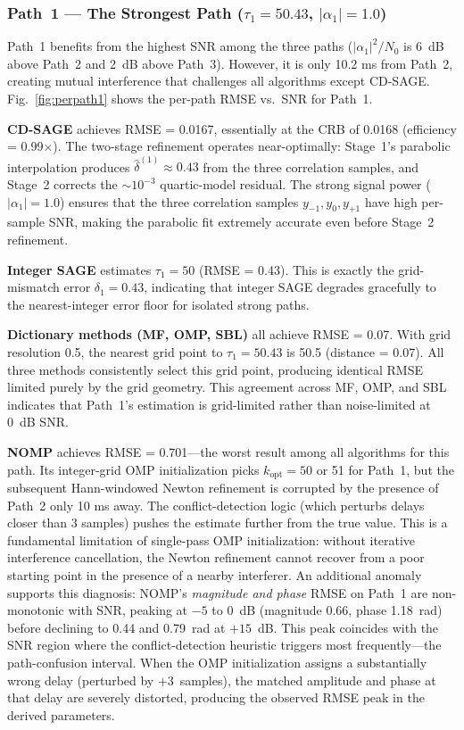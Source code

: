 \documentclass[a4paper,fleqn]{cas-dc}
\begin{document}
\subsubsection{Path~1 --- The Strongest Path ($\tau_1 = 50.43$, $|\alpha_1| = 1.0$)}

Path~1 benefits from the highest SNR among the three paths ($|\alpha_1|^2 / N_0$ is 6~dB above Path~2 and 2~dB above Path~3). However, it is only 10.2 ms from Path~2, creating mutual interference that challenges all algorithms except CD-SAGE. Fig.~\ref{fig:perpath1} shows the per-path RMSE vs.\ SNR for Path~1.

\textbf{CD-SAGE} achieves RMSE = 0.0167, essentially at the CRB of 0.0168 (efficiency = 0.99$\times$). The two-stage refinement operates near-optimally: Stage~1's parabolic interpolation produces $\hat{\delta}^{(1)} \approx 0.43$ from the three correlation samples, and Stage~2 corrects the $\sim 10^{-3}$ quartic-model residual. The strong signal power ($|\alpha_1|=1.0$) ensures that the three correlation samples $y_{-1}, y_0, y_{+1}$ have high per-sample SNR, making the parabolic fit extremely accurate even before Stage~2 refinement.

\textbf{Integer SAGE} estimates $\tau_1 = 50$ (RMSE = 0.43). This is exactly the grid-mismatch error $\delta_1 = 0.43$, indicating that integer SAGE degrades gracefully to the nearest-integer error floor for isolated strong paths.

\textbf{Dictionary methods (MF, OMP, SBL)} all achieve RMSE = 0.07. With grid resolution 0.5, the nearest grid point to $\tau_1 = 50.43$ is 50.5 (distance = 0.07). All three methods consistently select this grid point, producing identical RMSE limited purely by the grid geometry. This agreement across MF, OMP, and SBL indicates that Path~1's estimation is grid-limited rather than noise-limited at 0~dB SNR.

\textbf{NOMP} achieves RMSE = 0.701---the worst result among all algorithms for this path. Its integer-grid OMP initialization picks $k_{\text{opt}} = 50$ or 51 for Path~1, but the subsequent Hann-windowed Newton refinement is corrupted by the presence of Path~2 only 10 ms away. The conflict-detection logic (which perturbs delays closer than 3 samples) pushes the estimate further from the true value. This is a fundamental limitation of single-pass OMP initialization: without iterative interference cancellation, the Newton refinement cannot recover from a poor starting point in the presence of a nearby interferer. An additional anomaly supports this diagnosis: NOMP's \textit{magnitude and phase} RMSE on Path~1 are non-monotonic with SNR, peaking at $-5$ to $0$~dB (magnitude 0.66, phase 1.18~rad) before declining to 0.44 and 0.79~rad at $+15$~dB. This peak coincides with the SNR region where the conflict-detection heuristic triggers most frequently---the path-confusion interval. When the OMP initialization assigns a substantially wrong delay (perturbed by $+3$~samples), the matched amplitude and phase at that delay are severely distorted, producing the observed RMSE peak in the derived parameters.
\end{document}
